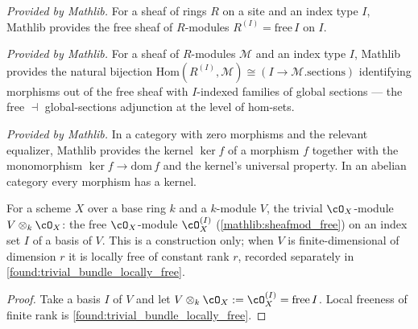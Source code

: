 \begin{definition}
  \label{mathlib:sheafmod_free}
  \mathlibok
  \textit{Provided by Mathlib.}
  For a sheaf of rings \(R\) on a site and an index type \(I\), Mathlib provides the
  free sheaf of \(R\)-modules \(R^{(I)}=\mathrm{free}\,I\) on \(I\).
\end{definition}

\begin{lemma}
  \label{mathlib:sheafmod_freehomequiv}
  \mathlibok
  \textit{Provided by Mathlib.}
  For a sheaf of \(R\)-modules \(\mathcal M\) and an index type \(I\), Mathlib
  provides the natural bijection
  \(\mathrm{Hom}(R^{(I)},\mathcal M)\cong(I\to\mathcal M.\mathrm{sections})\)
  identifying morphisms out of the free sheaf with \(I\)-indexed families of global
  sections --- the free \(\dashv\) global-sections adjunction at the level of
  hom-sets.
\end{lemma}

\begin{definition}
  \label{mathlib:categorical_kernel}
  \mathlibok
  \textit{Provided by Mathlib.}
  In a category with zero morphisms and the relevant equalizer, Mathlib provides the
  kernel \(\ker f\) of a morphism \(f\) together with the monomorphism
  \(\ker f\to\mathrm{dom}\,f\) and the kernel's universal property.  In an abelian
  category every morphism has a kernel.
\end{definition}

\begin{definition}
  \label{found:trivial_bundle}
  For a scheme \(X\) over a base ring \(k\) and a \(k\)-module \(V\), the trivial
  \(\cO_X\)-module \(V\otimes_k\cO_X\): the free \(\cO_X\)-module \(\cO_X^{(I)}\)
  (\cref{mathlib:sheafmod_free}) on an index set \(I\) of a basis of \(V\).  This is
  a construction only; when \(V\) is finite-dimensional of dimension \(r\) it is
  locally free of constant rank \(r\), recorded separately in
  \cref{found:trivial_bundle_locally_free}.
\end{definition}

\begin{proof}
  \leanok
  Take a basis \(I\) of \(V\) and let \(V\otimes_k\cO_X:=\cO_X^{(I)}=\mathrm{free}\,I\).
  Local freeness of finite rank is \cref{found:trivial_bundle_locally_free}.
\end{proof}

